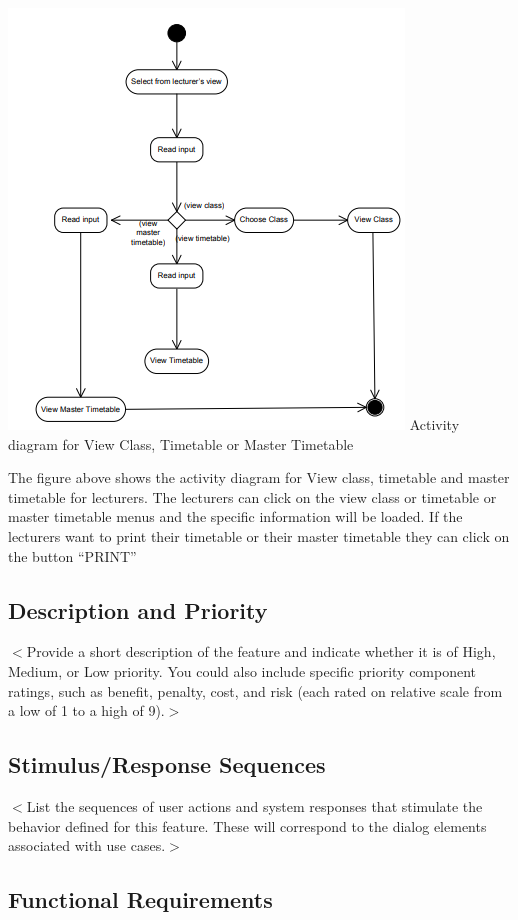 \documentclass{scrreprt}
\begin{document}
\begin{center}
\includegraphics[scale=0.8]{view.png}
Activity diagram for View Class, Timetable or Master Timetable 
\end{center}
The figure above shows the activity diagram for View class, timetable and master
timetable for lecturers. The lecturers can click on the view class or timetable or master
timetable menus and the specific information will be loaded. If the lecturers want to
print their timetable or their master timetable they can click on the button “PRINT”
\subsection{Description and Priority}
$<$Provide a short description of the feature and indicate whether it is of 
High, Medium, or Low priority. You could also include specific priority 
component ratings, such as benefit, penalty, cost, and risk (each rated on
relative scale from a low of 1 to a high of 9).$>$

\subsection{Stimulus/Response Sequences}
$<$List the sequences of user actions and system responses that stimulate the 
behavior defined for this feature. These will correspond to the dialog elements 
associated with use cases.$>$

\subsection{Functional Requirements}
 
\end{document}

